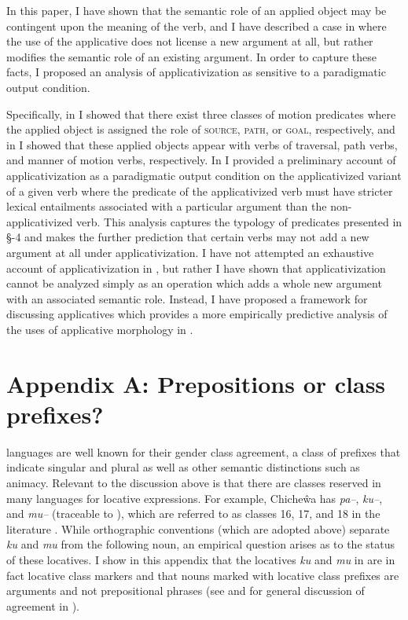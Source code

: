 \documentclass[output=paper]{langsci/langscibook}
\begin{document}
In this paper, I have shown that the semantic role of an applied object may be contingent upon the meaning of the verb, and I have described a case in  where the use of the applicative does not license a new argument at all, but rather modifies the semantic role of an existing argument. In order to capture these facts, I proposed an analysis of applicativization as sensitive to a paradigmatic output condition. 
 
Specifically, in  I showed that there exist three classes of motion predicates where the applied object is assigned the role of {\scshape source, path,} or {\scshape goal,} respectively, and in  I showed that  these applied objects appear with verbs of traversal, path verbs, and manner of motion verbs, respectively. In  I provided a preliminary account of applicativization as a paradigmatic output condition on the applicativized variant of a given verb where the predicate of the applicativized verb must have stricter lexical entailments associated with a particular argument than the non-applicativized verb. This analysis captures the typology of predicates presented in \S{}-4 and makes the further prediction that certain verbs may not add a new argument at all under applicativization. I have not attempted an exhaustive account of applicativization in , but rather I have shown that applicativization cannot be analyzed simply as an operation which adds a whole new argument with an associated semantic role. Instead, I have proposed a framework for discussing applicatives which provides a more empirically predictive analysis of the uses of applicative morphology in . 
 
 
 \section*{Appendix A: Prepositions or class prefixes?}
 
  languages are well known for their gender class agreement, a class of prefixes that indicate singular and plural as well as other semantic distinctions such as animacy. Relevant to the discussion above is that there are classes reserved in many  languages for locative expressions. For example, Chicheŵa has \emph{pa--}, \emph{ku--}, and \emph{mu--} (traceable to ), which are referred to as classes 16, 17, and 18 in the literature \citep{BresnanKanerva1989,bresnan:1994,bresnanmchombo:1995,maho:1999}. While  orthographic conventions (which are adopted above) separate \emph{ku} and \emph{mu} from the following noun, an empirical question arises as to the status of these locatives. I show in this appendix that the locatives \emph{ku} and \emph{mu} in  are in fact locative class markers and that nouns marked with locative class prefixes are arguments and not prepositional phrases (see \citealt{Jerro2013} and \citealt{JerroWechsler2015} for general discussion of agreement in ).
 
\end{document}
